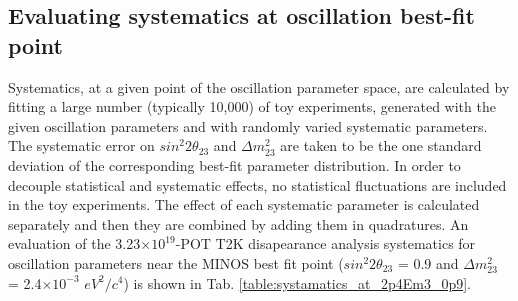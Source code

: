 \subsection {Evaluating systematics at oscillation best-fit point}
\label{sec:systematics_at_osc_bestfit}

Systematics, at a given point of the oscillation parameter space, are calculated by 
fitting a large number (typically 10,000) of toy experiments, generated with the 
given oscillation parameters and with randomly varied systematic parameters.
The systematic error on $sin^{2}2\theta_{23}$ and $\Delta m^{2}_{23}$ 
are taken to be the one standard deviation of the corresponding best-fit parameter distribution.
In order to decouple statistical and systematic effects, 
no statistical fluctuations are included in the toy experiments.
The effect of each systematic parameter is calculated separately
and then they are combined by adding them in quadratures.
An evaluation of the 3.23$\times 10^{19}$-POT T2K disapearance analysis systematics for 
oscillation parameters near the MINOS best fit point 
($sin^{2}2\theta_{23}$ = 0.9 and $\Delta m^{2}_{23}$ = 2.4$\times10^{-3}$ $eV^{2}/c^{4}$)
is shown in Tab. \ref{table:systamatics_at_2p4Em3_0p9}.

